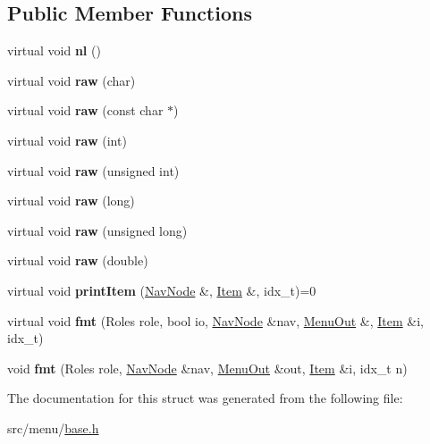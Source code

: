\subsection*{Public Member Functions}
\begin{DoxyCompactItemize}
\item 
\mbox{\label{structMenuOut_ad050b1d54cc0ab46ebe877b2d6ff4c31}} 
virtual void {\bfseries nl} ()
\item 
\mbox{\label{structMenuOut_adf86b6ce1d91d71b701cd2651a2d92f5}} 
virtual void {\bfseries raw} (char)
\item 
\mbox{\label{structMenuOut_a6b833edd18f9ae956fc30b67f34de684}} 
virtual void {\bfseries raw} (const char $\ast$)
\item 
\mbox{\label{structMenuOut_a675212b21eb703dfabf22c0a92625827}} 
virtual void {\bfseries raw} (int)
\item 
\mbox{\label{structMenuOut_a39ff3bae07e2c0d07b5876cbc41d7db7}} 
virtual void {\bfseries raw} (unsigned int)
\item 
\mbox{\label{structMenuOut_a0ba6c90717513f82da4d77c5606fcbbb}} 
virtual void {\bfseries raw} (long)
\item 
\mbox{\label{structMenuOut_ad345ce430a5e2e1d02bf1d65ffe120b3}} 
virtual void {\bfseries raw} (unsigned long)
\item 
\mbox{\label{structMenuOut_acfa10821cff88f9986d643029516198f}} 
virtual void {\bfseries raw} (double)
\item 
\mbox{\label{structMenuOut_ac1f30c588c0349d9f865f873a09d2268}} 
virtual void {\bfseries print\+Item} (\hyperlink{structNavNode}{Nav\+Node} \&, \hyperlink{structItem}{Item} \&, idx\+\_\+t)=0
\item 
\mbox{\label{structMenuOut_af40844bea29055ba952fabad9fb22a2c}} 
virtual void {\bfseries fmt} (Roles role, bool io, \hyperlink{structNavNode}{Nav\+Node} \&nav, \hyperlink{structMenuOut}{Menu\+Out} \&, \hyperlink{structItem}{Item} \&i, idx\+\_\+t)
\item 
\mbox{\label{structMenuOut_a088035e2856035a800abccba10a7299d}} 
void {\bfseries fmt} (Roles role, \hyperlink{structNavNode}{Nav\+Node} \&nav, \hyperlink{structMenuOut}{Menu\+Out} \&out, \hyperlink{structItem}{Item} \&i, idx\+\_\+t n)
\end{DoxyCompactItemize}


The documentation for this struct was generated from the following file\+:\begin{DoxyCompactItemize}
\item 
src/menu/\hyperlink{base_8h}{base.\+h}\end{DoxyCompactItemize}
